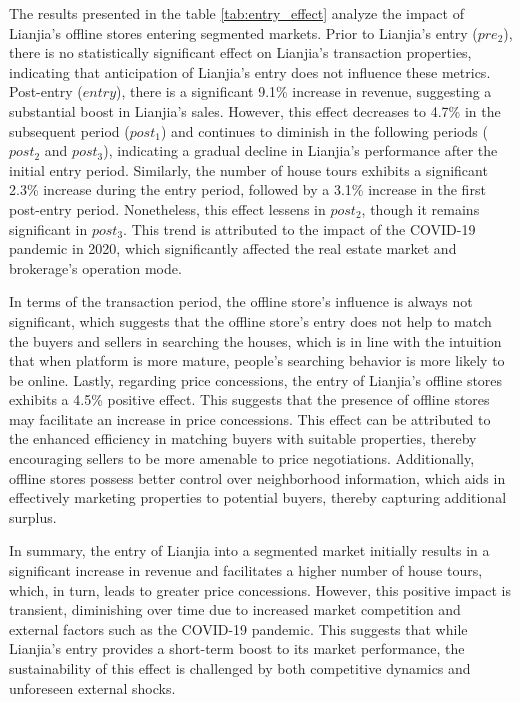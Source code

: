 \documentclass[11pt]{article}
\begin{document}
The results presented in the table \ref{tab:entry_effect} analyze the impact of Lianjia's offline stores entering segmented markets. Prior to Lianjia's entry ($pre_2$), there is no statistically significant effect on Lianjia's transaction properties, indicating that anticipation of Lianjia's entry does not influence these metrics. Post-entry ($entry$), there is a significant 9.1\% increase in revenue, suggesting a substantial boost in Lianjia's sales. However, this effect decreases to 4.7\% in the subsequent period ($post_1$) and continues to diminish in the following periods ($post_2$ and $post_3$), indicating a gradual decline in Lianjia's performance after the initial entry period. Similarly, the number of house tours exhibits a significant 2.3\% increase during the entry period, followed by a 3.1\% increase in the first post-entry period. Nonetheless, this effect lessens in $post_2$, though it remains significant in $post_3$. This trend is attributed to the impact of the COVID-19 pandemic in 2020, which significantly affected the real estate market and brokerage's operation mode.

In terms of the transaction period, the offline store's influence is always not significant, which suggests that the offline store's entry does not help to match the buyers and sellers in searching the houses, which is in line with the intuition that when platform is more mature, people's searching behavior is more likely to be online. Lastly, regarding price concessions, the entry of Lianjia's offline stores exhibits a 4.5\% positive effect. This suggests that the presence of offline stores may facilitate an increase in price concessions. This effect can be attributed to the enhanced efficiency in matching buyers with suitable properties, thereby encouraging sellers to be more amenable to price negotiations. Additionally, offline stores possess better control over neighborhood information, which aids in effectively marketing properties to potential buyers, thereby capturing additional surplus.

In summary, the entry of Lianjia into a segmented market initially results in a significant increase in revenue and facilitates a higher number of house tours, which, in turn, leads to greater price concessions. However, this positive impact is transient, diminishing over time due to increased market competition and external factors such as the COVID-19 pandemic. This suggests that while Lianjia's entry provides a short-term boost to its market performance, the sustainability of this effect is challenged by both competitive dynamics and unforeseen external shocks.
\end{document}
